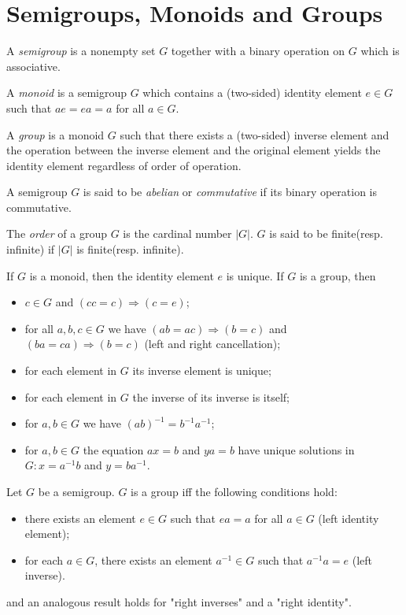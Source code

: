 \section{Semigroups, Monoids and Groups}
\begin{definition}
	A \textit{semigroup} is a nonempty set $ G $ together with a binary operation on $ G $ which is associative.
\end{definition}
\begin{definition}
	A \textit{monoid} is a semigroup $ G $ which contains a (two-sided) identity element $ e \in G $ such that $ ae=ea=a $ for all $ a \in G $.
\end{definition}
\begin{definition}
	A \textit{group} is a monoid $ G $ such that there exists a (two-sided) inverse element and the operation between the inverse element and the original element yields the identity element regardless of order of operation.
\end{definition}
\begin{definition}
	A semigroup $ G $ is said to be \textit{abelian} or \textit{commutative} if its binary operation is commutative.
\end{definition}
\begin{definition}
	The \textit{order} of a group $ G $ is the cardinal number $ |G| $. $ G $ is said to be finite(resp. infinite) if $ |G| $ is finite(resp. infinite).
\end{definition}
\begin{theorem}
	If $ G $ is a monoid, then the identity element $ e $ is unique. If $ G $ is a group, then
	\begin{itemize}
		\item $ c \in G $ and $ (cc=c)\Rightarrow (c=e) $;
		\item for all $ a,b,c\in G $ we have $ (ab=ac)\Rightarrow(b=c) $ and $ (ba=ca)\Rightarrow(b=c) $ (left and right cancellation);
		\item for each element in $ G $ its inverse element is unique;
		\item for each element in $ G $ the inverse of its inverse is itself;
		\item for $ a,b\in G $ we have $ (ab)^{-1}=b^{-1}a^{-1} $;
		\item for $ a,b\in G $ the equation $ ax=b $ and $ ya=b $ have unique solutions in $ G:x=a^{-1}b $ and $ y=b a^{-1} $.
	\end{itemize}
\end{theorem}
\begin{Proposition}
	Let $ G $ be a semigroup. $ G $ is a group iff the following conditions hold:
	\begin{itemize}
		\item there exists an element $ e \in G $ such that $ ea=a $ for all $ a \in G $ (left identity element);
		\item for each $ a \in G $, there exists an element $ a^{-1} \in G$ such that $ a^{-1}a=e $ (left inverse).
	\end{itemize}
and an analogous result holds for "right inverses" and a "right identity".
\end{Proposition}


